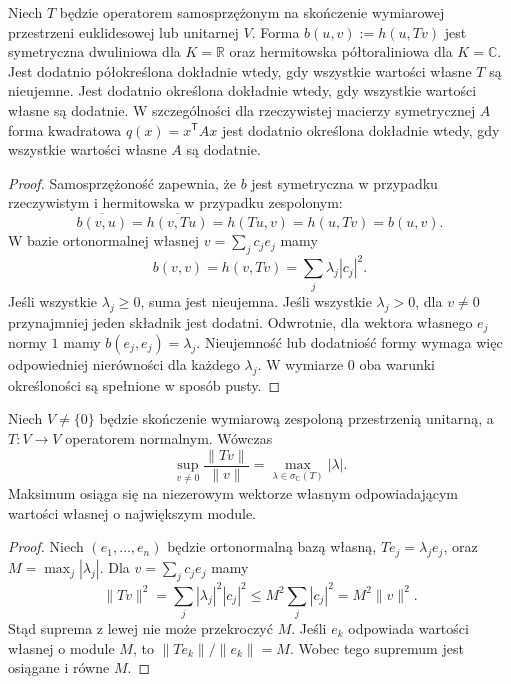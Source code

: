 \begin{wniosek}
\label{cor:lin14-definiteness}
Niech \(T\) będzie operatorem
samosprzężonym na skończenie
wymiarowej przestrzeni
euklidesowej lub unitarnej
\(V\).
Forma \(b(u,v):=h(u,Tv)\) jest
symetryczna dwuliniowa dla \(K=\mathbb R\)
oraz hermitowska półtoraliniowa dla \(K=\mathbb C\).
Jest dodatnio półokreślona
dokładnie wtedy, gdy wszystkie
wartości własne \(T\)
są nieujemne.
Jest dodatnio określona
dokładnie wtedy, gdy wszystkie
wartości własne są dodatnie.
W szczególności dla
rzeczywistej macierzy
symetrycznej \(A\)
forma kwadratowa \(q(x)=x^{\mathsf T}Ax\)
jest dodatnio określona
dokładnie wtedy, gdy wszystkie
wartości własne \(A\) są dodatnie.
\end{wniosek}
\begin{proof}
Samosprzężoność zapewnia,
że \(b\) jest symetryczna w przypadku rzeczywistym
i hermitowska w przypadku zespolonym:
\[
 \overline{b(v,u)}
 =\overline{h(v,Tu)}
 =h(Tu,v)=h(u,Tv)=b(u,v).
\]
W bazie ortonormalnej własnej
\(v=\sum_jc_je_j\) mamy
\[
 b(v,v)=h(v,Tv)
       =\sum_j\lambda_j|c_j|^2.
\]
Jeśli wszystkie \(\lambda_j\ge0\),
suma jest nieujemna.
Jeśli wszystkie \(\lambda_j>0\),
dla \(v\ne0\) przynajmniej
jeden składnik jest dodatni.
Odwrotnie, dla wektora
własnego \(e_j\) normy \(1\)
mamy \(b(e_j,e_j)=\lambda_j\).
Nieujemność lub dodatniość
formy wymaga więc odpowiedniej
nierówności dla każdego
\(\lambda_j\).
W wymiarze \(0\) oba warunki
określoności są spełnione
w sposób pusty.
\end{proof}

\begin{stwierdzenie}
\label{prop:lin14-normal-operator-norm}
Niech \(V\ne\{0\}\) będzie
skończenie wymiarową
zespoloną przestrzenią unitarną,
a \(T\colon V\to V\) operatorem normalnym.
Wówczas
\[
 \sup_{v\ne0}\frac{\|Tv\|}{\|v\|}
 =\max_{\lambda\in\sigma_{\mathbb C}(T)}
                                  |\lambda|.
\]
Maksimum osiąga się
na niezerowym wektorze własnym
odpowiadającym wartości własnej
o największym module.
\end{stwierdzenie}
\begin{proof}
Niech \((e_1,\ldots,e_n)\)
będzie ortonormalną bazą własną,
\(Te_j=\lambda_je_j\),
oraz
\(M=\max_j|\lambda_j|\).
Dla \(v=\sum_jc_je_j\) mamy
\[
 \|Tv\|^2=\sum_j|\lambda_j|^2|c_j|^2
 \le M^2\sum_j|c_j|^2=M^2\|v\|^2.
\]
Stąd suprema z lewej
nie może przekroczyć \(M\).
Jeśli \(e_k\) odpowiada
wartości własnej o module \(M\),
to \(\|Te_k\|/\|e_k\|=M\).
Wobec tego supremum jest
osiągane i równe \(M\).
\end{proof}


